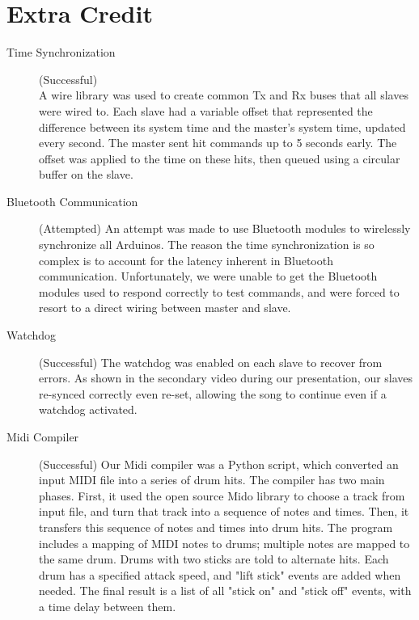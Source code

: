 \documentclass[]{article}
\begin{document}
\section{Extra Credit}
\begin{description}
		\item [Time Synchronization] (Successful)\\
		A wire library was used to create common Tx and Rx buses that all slaves were wired to. Each slave had a variable offset that represented the difference between its system time and the master's system time, updated every second. The master sent hit commands up to 5 seconds early. The offset was applied to the time on these hits, then queued using a circular buffer on the slave. 
		\item [Bluetooth Communication]	(Attempted)
		An attempt was made to use Bluetooth modules to wirelessly synchronize all Arduinos. The reason the time synchronization is so complex is to account for the latency inherent in Bluetooth communication. Unfortunately, we were unable to get the Bluetooth modules used to respond correctly to test commands, and were forced to resort to a direct wiring between master and slave. 
		\item [Watchdog] (Successful)
		The watchdog was enabled on each slave to recover from errors. As shown in the secondary video during our presentation, our slaves re-synced correctly even re-set, allowing the song to continue even if a watchdog activated. 
		\item [Midi Compiler] (Successful)
		Our Midi compiler was a Python script, which converted an input MIDI file into a series of drum hits. The compiler has two main phases. First, it used the open source Mido library to choose a track from input file, and turn that track into a sequence of notes and times. Then, it transfers this sequence of notes and times into drum hits. The program includes a mapping of MIDI notes to drums; multiple notes are mapped to the same drum. Drums with two sticks are told to alternate hits. Each drum has a specified attack speed, and "lift stick" events are added when needed. The final result is a list of all "stick on" and "stick off" events, with a time delay between them.
		
		

	
\end{description}
\end{document}
